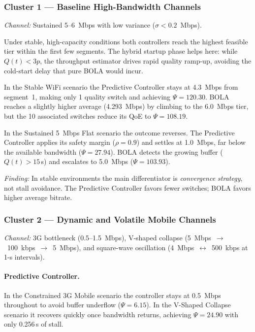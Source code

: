 \documentclass[conference]{IEEEtran}
\begin{document}
\subsubsection{Cluster 1 — Baseline High-Bandwidth Channels}

\textit{Channel:} Sustained 5--6~Mbps with low variance
($\sigma<0.2$~Mbps).

Under stable, high-capacity conditions both controllers reach the highest
feasible tier within the first few segments.  The hybrid startup phase
helps here: while $Q(t)<3p$, the throughput estimator drives rapid
quality ramp-up, avoiding the cold-start delay that pure BOLA would incur.

In the Stable WiFi scenario the Predictive Controller stays at 4.3~Mbps
from segment~1, making only 1 quality switch and achieving $\Psi=120.30$.
BOLA reaches a slightly higher average (4.293~Mbps) by climbing to the
6.0~Mbps tier, but the 10 associated switches reduce its QoE to
$\Psi=108.19$.

In the Sustained 5~Mbps Flat scenario the outcome reverses.  The
Predictive Controller applies its safety margin ($\rho=0.9$) and settles
at 1.0~Mbps, far below the available bandwidth ($\Psi=27.94$).  BOLA
detects the growing buffer ($Q(t)>15$\,s) and escalates to 5.0~Mbps
($\Psi=103.93$).

\textit{Finding:} In stable environments the main differentiator is
\emph{convergence strategy}, not stall avoidance.  The Predictive
Controller favors fewer switches; BOLA favors higher average bitrate.

\subsubsection{Cluster 2 — Dynamic and Volatile Mobile Channels}

\textit{Channel:} 3G bottleneck (0.5--1.5~Mbps), V-shaped collapse
(5~Mbps~$\to$~100~kbps~$\to$~5~Mbps), and square-wave oscillation
(4~Mbps~$\leftrightarrow$~500~kbps at 1-s intervals).

\paragraph{Predictive Controller.}
In the Constrained 3G Mobile scenario the controller stays at 0.5~Mbps
throughout to avoid buffer underflow ($\Psi=6.15$).  In the V-Shaped
Collapse scenario it recovers quickly once bandwidth returns, achieving
$\Psi=24.90$ with only 0.256\,s of stall.
\end{document}
